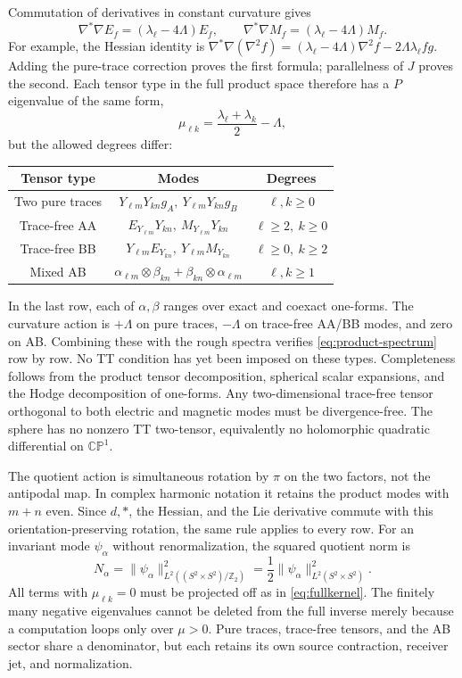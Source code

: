 \documentclass[a4paper,11pt]{article}
\numberwithin{equation}{section}
\theoremstyle{definition}
\newcommand{\CP}{\mathbb{CP}}
\newcommand{\Z}{\mathbb Z}
\begin{document}
Commutation of derivatives in constant curvature gives
\[
\nabla^*\nabla E_f=(\lambda_\ell-4\Lambda)E_f,
\qquad \nabla^*\nabla M_f=(\lambda_\ell-4\Lambda)M_f.
\]
For example, the Hessian identity is
$\nabla^*\nabla(\nabla^2f)=
(\lambda_\ell-4\Lambda)\nabla^2f-2\Lambda\lambda_\ell fg$.
Adding the pure-trace correction proves the first formula; parallelness of $J$ proves the second.
Each tensor type in the full product space therefore has a $P$ eigenvalue of the same form,
\begin{equation}\label{eq:product-spectrum}
\mu_{\ell k}=\frac{\lambda_\ell+\lambda_k}{2}-\Lambda,
\end{equation}
but the allowed degrees differ:
\begin{center}
\small
\begin{tabular}{c c c}
\toprule
Tensor type & Modes & Degrees\\\midrule
Two pure traces & $Y_{\ell m}Y_{kn}g_A,\ Y_{\ell m}Y_{kn}g_B$ & $\ell,k\ge0$\\
Trace-free AA & $E_{Y_{\ell m}}Y_{kn},\ M_{Y_{\ell m}}Y_{kn}$ & $\ell\ge2,\ k\ge0$\\
Trace-free BB & $Y_{\ell m}E_{Y_{kn}},\ Y_{\ell m}M_{Y_{kn}}$ & $\ell\ge0,\ k\ge2$\\
Mixed AB & $\alpha_{\ell m}\otimes\beta_{kn}+\beta_{kn}\otimes\alpha_{\ell m}$ & $\ell,k\ge1$\\\bottomrule
\end{tabular}
\end{center}
In the last row, each of $\alpha,\beta$ ranges over exact and coexact one-forms.
The curvature action is $+\Lambda$ on pure traces, $-\Lambda$ on trace-free AA/BB modes,
and zero on AB. Combining these with the rough spectra verifies \eqref{eq:product-spectrum} row by row.
No TT condition has yet been imposed on these types. Completeness follows from the product tensor decomposition, spherical scalar expansions, and the Hodge decomposition of one-forms.
Any two-dimensional trace-free tensor orthogonal to both electric and magnetic modes must be divergence-free.
The sphere has no nonzero TT two-tensor, equivalently no holomorphic quadratic differential on $\CP^1$.

The quotient action is simultaneous rotation by $\pi$ on the two factors, not the antipodal map.
In complex harmonic notation it retains the product modes with $m+n$ even.
Since $d,*$, the Hessian, and the Lie derivative commute with this orientation-preserving rotation, the same rule applies to every row.
For an invariant mode $\psi_\alpha$ without renormalization, the squared quotient norm is
\[
N_\alpha=\|\psi_\alpha\|_{L^2((S^2\times S^2)/\Z_2)}^2
=\frac12\|\psi_\alpha\|_{L^2(S^2\times S^2)}^2.
\]
All terms with $\mu_{\ell k}=0$ must be projected off as in \eqref{eq:fullkernel}.
The finitely many negative eigenvalues cannot be deleted from the full inverse merely because a computation loops only over $\mu>0$.
Pure traces, trace-free tensors, and the AB sector share a denominator, but each retains its own source contraction, receiver jet, and normalization.
\end{document}
